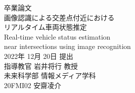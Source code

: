 \thispagestyle{empty}
\begin{center}
\vspace*{-1cm}
\Huge{卒業論文}\\
\vspace{1cm}
\LARGE{画像認識による交差点付近における\\リアルタイム車両状態推定}\\
\vspace{0.2cm}
\large{Real-time vehicle status estimation \\ near intersections using image recognition}\\
\vspace{2cm}
\Large{2022年 12月 20日 提出}\\
\vspace{2cm}
\LARGE{指導教官 岩井将行 教授}\\
\vspace{1cm}
\LARGE{未来科学部 情報メディア学科}\\
\vspace{1cm}
\huge{20FMI02 安齋凌介}\\
\end{center}
